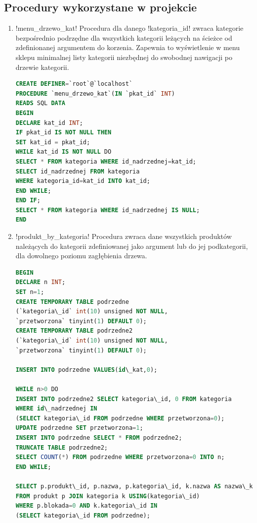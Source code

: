 \subsection{Procedury wykorzystane w projekcie}
\begin{enumerate}
\item \s!menu_drzewo_kat! 
Procedura dla danego \s!kategoria_id! zwraca kategorie bezpośrednio podrzędne dla wszystkich kategorii leżących na ścieżce od zdefinionanej argumentem do korzenia. Zapewnia to wyświetlenie w menu sklepu minimalnej listy kategorii niezbędnej do swobodnej nawigacji po drzewie kategorii.
\begin{lstlisting}[language=SQL]
CREATE DEFINER=`root`@`localhost` 
PROCEDURE `menu_drzewo_kat`(IN `pkat_id` INT)
READS SQL DATA
BEGIN
DECLARE kat_id INT;
IF pkat_id IS NOT NULL THEN
SET kat_id = pkat_id;
WHILE kat_id IS NOT NULL DO
SELECT * FROM kategoria WHERE id_nadrzednej=kat_id;
SELECT id_nadrzednej FROM kategoria 
WHERE kategoria_id=kat_id INTO kat_id;
END WHILE;
END IF;
SELECT * FROM kategoria WHERE id_nadrzednej IS NULL;
END
\end{lstlisting}
\item \s!produkt_by_kategoria! 
Procedura zwraca dane wszystkich produktów należących do kategorii zdefiniowanej jako argument lub do jej podkategorii, dla dowolnego poziomu zagłębienia drzewa.
\begin{lstlisting}[language=SQL]
BEGIN
DECLARE n INT;
SET n=1;
CREATE TEMPORARY TABLE podrzedne 
(`kategoria\_id` int(10) unsigned NOT NULL, 
`przetworzona` tinyint(1) DEFAULT 0);
CREATE TEMPORARY TABLE podrzedne2 
(`kategoria\_id` int(10) unsigned NOT NULL, 
`przetworzona` tinyint(1) DEFAULT 0);

INSERT INTO podrzedne VALUES(id\_kat,0);

WHILE n>0 DO
INSERT INTO podrzedne2 SELECT kategoria\_id, 0 FROM kategoria 
WHERE id\_nadrzednej IN 
(SELECT kategoria\_id FROM podrzedne WHERE przetworzona=0);
UPDATE podrzedne SET przetworzona=1;
INSERT INTO podrzedne SELECT * FROM podrzedne2;
TRUNCATE TABLE podrzedne2;
SELECT COUNT(*) FROM podrzedne WHERE przetworzona=0 INTO n;
END WHILE;

SELECT p.produkt\_id, p.nazwa, p.kategoria\_id, k.nazwa AS nazwa\_kat  
FROM produkt p JOIN kategoria k USING(kategoria\_id) 
WHERE p.blokada=0 AND k.kategoria\_id IN 
(SELECT kategoria\_id FROM podrzedne);


\end{lstlisting}
\end{enumerate}
